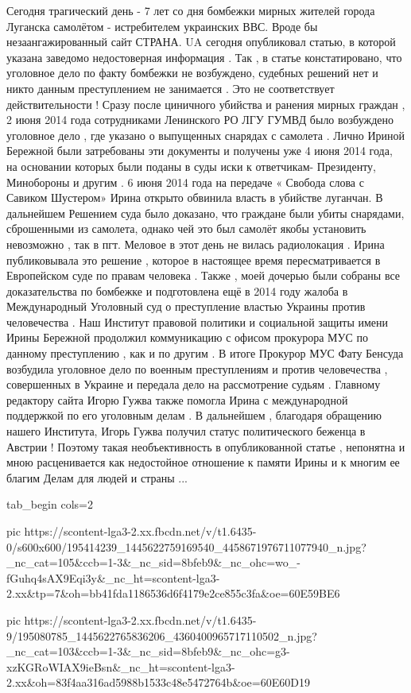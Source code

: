 Сегодня трагический день - 7 лет со дня бомбежки мирных жителей города Луганска
самолётом - истребителем  украинских ВВС. Вроде бы незаангажированный сайт
СТРАНА. UA сегодня опубликовал статью, в которой указана заведомо недостоверная
информация . Так , в статье констатировано, что уголовное дело по факту
бомбежки не возбуждено, судебных решений нет и никто данным преступлением не
занимается . Это не соответствует действительности ! Сразу  после циничного
убийства и ранения мирных граждан , 2 июня 2014 года сотрудниками Ленинского РО
ЛГУ ГУМВД  было возбуждено уголовное дело , где указано о выпущенных снарядах с
самолета . Лично Ириной Бережной были затребованы эти документы и получены уже
4 июня 2014 года, на основании которых были поданы в суды иски к ответчикам-
Президенту, Минобороны и другим . 6 июня 2014 года на передаче « Свобода слова
с Савиком Шустером» Ирина открыто обвинила власть в убийстве луганчан. В
дальнейшем Решением суда было доказано, что граждане были убиты снарядами,
сброшенными из самолета, однако чей это был самолёт якобы установить невозможно
, так в пгт. Меловое в этот день  не вилась радиолокация . Ирина публиковывала
это решение , которое  в настоящее время пересматривается в Европейском суде по
правам человека . Также , моей дочерью были собраны все доказательства по
бомбежке и подготовлена ещё в 2014 году жалоба в Международный Уголовный суд  о
преступление властью Украины против человечества . Наш Институт правовой
политики и социальной защиты имени Ирины Бережной продолжил коммуникацию с
офисом прокурора МУС по данному преступлению , как и по другим . В итоге
Прокурор МУС Фату Бенсуда возбудила уголовное дело по военным преступлениям и
против человечества , совершенных в Украине и передала дело  на рассмотрение
судьям . Главному редактору сайта Игорю Гужва также помогла Ирина с
международной поддержкой по его уголовным делам . В дальнейшем , благодаря
обращению нашего Института, Игорь Гужва получил статус политического беженца в
Австрии ! Поэтому такая необъективность в опубликованной статье , непонятна и
мною расценивается как недостойное отношение к памяти Ирины и к многим ее
благим Делам  для людей и страны ...

\ifcmt
  tab_begin cols=2

     pic https://scontent-lga3-2.xx.fbcdn.net/v/t1.6435-0/s600x600/195414239_1445622759169540_4458671976711077940_n.jpg?_nc_cat=105&ccb=1-3&_nc_sid=8bfeb9&_nc_ohc=wo_-fGuhq4sAX9Eqi3y&_nc_ht=scontent-lga3-2.xx&tp=7&oh=bb41fda1186536d6f4179e2ce855c3fa&oe=60E59BE6

     pic https://scontent-lga3-2.xx.fbcdn.net/v/t1.6435-9/195080785_1445622765836206_4360400965717110502_n.jpg?_nc_cat=103&ccb=1-3&_nc_sid=8bfeb9&_nc_ohc=g3-xzKGRoWIAX9ieBsn&_nc_ht=scontent-lga3-2.xx&oh=83f4aa316ad5988b1533c48e5472764b&oe=60E60D19

